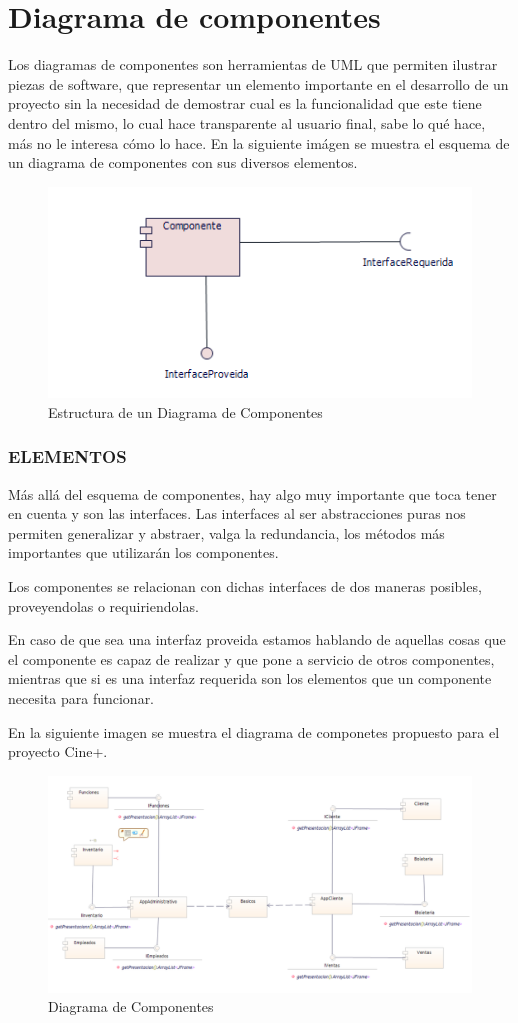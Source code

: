 \chapter{Diagrama de componentes}	
	Los diagramas de componentes son herramientas de UML que permiten ilustrar piezas de software, que representar un elemento importante en el desarrollo de un proyecto sin la necesidad de demostrar cual es la funcionalidad que este tiene dentro del mismo, lo cual hace transparente al usuario final, sabe lo qué hace, más no le interesa cómo lo hace. En la siguiente imágen se muestra el esquema de un diagrama de componentes con sus diversos elementos.
	
\begin{figure}[h!]
	\centering
	\includegraphics[scale=0.8]{diseno/componentes/imgs/comp}
	\caption{Estructura de un Diagrama de Componentes}
\end{figure}

\subsection*{ELEMENTOS}
Más allá del esquema de componentes, hay algo muy importante que toca tener en cuenta y son las interfaces. Las interfaces al ser abstracciones puras nos permiten generalizar y abstraer, valga la redundancia, los métodos más importantes que utilizarán los componentes. 

Los componentes se relacionan con dichas interfaces de dos maneras posibles, proveyendolas o requiriendolas.

En caso de que sea una interfaz  proveida estamos hablando de aquellas cosas que el componente es capaz de realizar y que pone a servicio de otros componentes, mientras que si es una interfaz requerida son los elementos que un componente necesita para funcionar.

En la siguiente imagen se muestra el diagrama de componetes propuesto para el proyecto Cine+.

\begin{figure}[h!]
	\centering
	\includegraphics[scale=0.6]{diseno/componentes/imgs/diagramaComponentes}
	\caption{Diagrama de Componentes}
\end{figure}